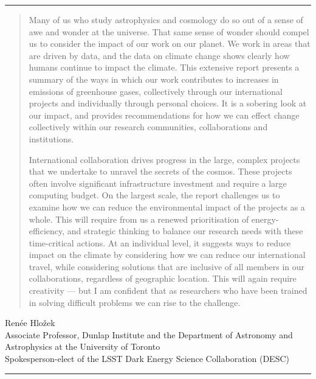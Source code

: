 \documentclass[../SustainableHEP.tex]{subfiles}
\begin{document}
\textcolor{Pythongreen}{\rule{2cm}{3pt}}

\begin{quotation}
Many of us who study astrophysics and cosmology do so out of a sense of awe and wonder at the universe. That same sense of wonder should compel us to consider the impact of our work on our planet. We work in areas that are driven by data, and the data on climate change shows clearly how humans continue to impact the climate.  This extensive report presents a summary of the ways in which our work contributes to increases in emissions of greenhouse gases, collectively through our international projects and individually through personal choices. It is a sobering look at our impact, and provides recommendations for how we can effect change collectively within our research communities, collaborations and institutions. 

International collaboration drives progress in the large, complex projects that we undertake to unravel the secrets of the cosmos. These projects often involve significant infrastructure investment and require a large computing budget. On the largest scale, the report challenges us to examine how we can reduce the environmental impact of the projects as a whole. This will require from us a renewed prioritisation of energy-efficiency, and strategic thinking to balance our research needs with these time-critical actions.  At an individual level, it suggests ways to reduce impact on the climate by considering how we can reduce our international travel, while considering solutions that are inclusive of all members in our collaborations, regardless of geographic location. This will again require creativity — but I am confident that as researchers who have been trained in solving difficult problems we can rise to the challenge.
\end{quotation}
\begin{flushleft}
Ren\'{e}e Hlo\v{z}ek\\
Associate Professor, Dunlap Institute and the Department of Astronomy and Astrophysics at the University of Toronto\\
Spokesperson-elect of the LSST Dark Energy Science Collaboration (DESC)
\end{flushleft}

\textcolor{Pythongreen}{\rule{2cm}{3pt}}
\end{document}
